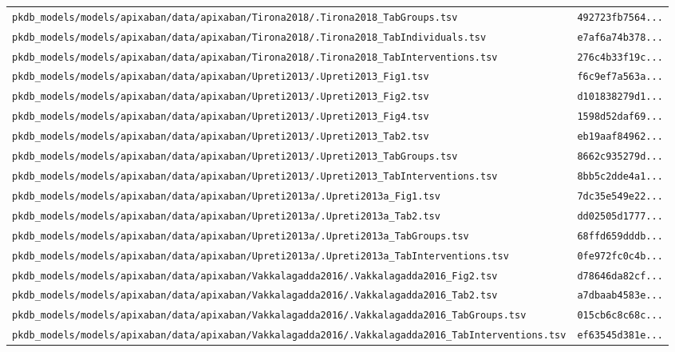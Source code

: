 \documentclass{article}
\begin{document}
\begin{longtable}{ll}
\texttt{pkdb\_models/models/apixaban/data/apixaban/Tirona2018/.Tirona2018\_TabGroups.tsv} & \texttt{492723fb7564...} \\
\texttt{pkdb\_models/models/apixaban/data/apixaban/Tirona2018/.Tirona2018\_TabIndividuals.tsv} & \texttt{e7af6a74b378...} \\
\texttt{pkdb\_models/models/apixaban/data/apixaban/Tirona2018/.Tirona2018\_TabInterventions.tsv} & \texttt{276c4b33f19c...} \\
\texttt{pkdb\_models/models/apixaban/data/apixaban/Upreti2013/.Upreti2013\_Fig1.tsv} & \texttt{f6c9ef7a563a...} \\
\texttt{pkdb\_models/models/apixaban/data/apixaban/Upreti2013/.Upreti2013\_Fig2.tsv} & \texttt{d101838279d1...} \\
\texttt{pkdb\_models/models/apixaban/data/apixaban/Upreti2013/.Upreti2013\_Fig4.tsv} & \texttt{1598d52daf69...} \\
\texttt{pkdb\_models/models/apixaban/data/apixaban/Upreti2013/.Upreti2013\_Tab2.tsv} & \texttt{eb19aaf84962...} \\
\texttt{pkdb\_models/models/apixaban/data/apixaban/Upreti2013/.Upreti2013\_TabGroups.tsv} & \texttt{8662c935279d...} \\
\texttt{pkdb\_models/models/apixaban/data/apixaban/Upreti2013/.Upreti2013\_TabInterventions.tsv} & \texttt{8bb5c2dde4a1...} \\
\texttt{pkdb\_models/models/apixaban/data/apixaban/Upreti2013a/.Upreti2013a\_Fig1.tsv} & \texttt{7dc35e549e22...} \\
\texttt{pkdb\_models/models/apixaban/data/apixaban/Upreti2013a/.Upreti2013a\_Tab2.tsv} & \texttt{dd02505d1777...} \\
\texttt{pkdb\_models/models/apixaban/data/apixaban/Upreti2013a/.Upreti2013a\_TabGroups.tsv} & \texttt{68ffd659dddb...} \\
\texttt{pkdb\_models/models/apixaban/data/apixaban/Upreti2013a/.Upreti2013a\_TabInterventions.tsv} & \texttt{0fe972fc0c4b...} \\
\texttt{pkdb\_models/models/apixaban/data/apixaban/Vakkalagadda2016/.Vakkalagadda2016\_Fig2.tsv} & \texttt{d78646da82cf...} \\
\texttt{pkdb\_models/models/apixaban/data/apixaban/Vakkalagadda2016/.Vakkalagadda2016\_Tab2.tsv} & \texttt{a7dbaab4583e...} \\
\texttt{pkdb\_models/models/apixaban/data/apixaban/Vakkalagadda2016/.Vakkalagadda2016\_TabGroups.tsv} & \texttt{015cb6c8c68c...} \\
\texttt{pkdb\_models/models/apixaban/data/apixaban/Vakkalagadda2016/.Vakkalagadda2016\_TabInterventions.tsv} & \texttt{ef63545d381e...} \\

\end{longtable}
\end{document}
